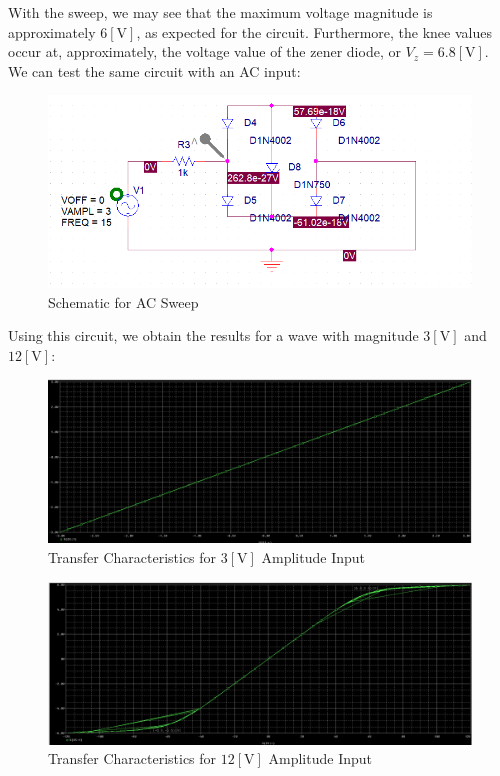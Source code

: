 \begin{enumerate}
    With the sweep, we may see that the maximum voltage magnitude is approximately $6[\si{\volt}]$, as expected for the circuit. Furthermore, the knee values occur at, approximately, the voltage value of the zener diode, or $V_{z}=6.8[\si{\volt}]$. We can test the same circuit with an AC input:

    \begin{figure}[H]
      \centering
      \includegraphics[width=.9\textwidth]{Figures/HW4-5c}
      \caption{Schematic for AC Sweep}
      \label{fig:15}
    \end{figure}

    Using this circuit, we obtain the results for a wave with magnitude $3[\si{\volt}]$ and $12[\si{\volt}]$:

    \begin{figure}[H]
      \centering
      \includegraphics[width=.85\textwidth]{Figures/HW4-5d}
      \caption{Transfer Characteristics for $3[\si{\volt}]$ Amplitude Input}
      \label{fig:16}
    \end{figure}

    \begin{figure}[H]
      \centering
      \includegraphics[width=.85\textwidth]{Figures/HW4-5e}
      \caption{Transfer Characteristics for $12[\si{\volt}]$ Amplitude Input}
      \label{fig:17}
    \end{figure}


\end{enumerate}
